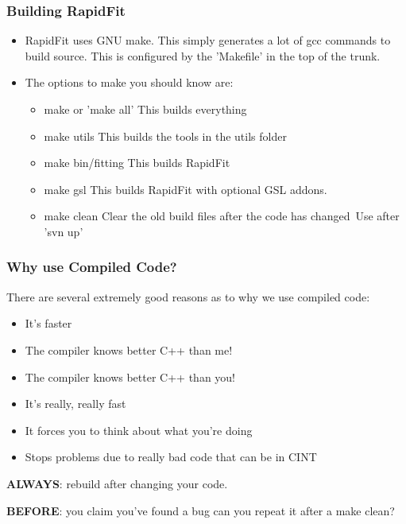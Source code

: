 \documentclass{beamer}
\begin{document}
\begin{frame}
\frametitle{Building RapidFit}
\begin{itemize}
 \item RapidFit uses GNU make.\newline
 This simply generates a lot of gcc commands to build source.\newline
 This is configured by the 'Makefile' in the top of the trunk.\newline
 \item The options to make you should know are:
 \small
 \begin{itemize}
  \item make or 'make all'\newline
  This builds everything
  \item make utils\newline
  This builds the tools in the utils folder
  \item make bin/fitting\newline
  This builds RapidFit
  \item make gsl\newline
  This builds RapidFit with optional GSL addons.
  \item make clean\newline
  Clear the old build files after the code has changed\newline~Use after 'svn up'
 \end{itemize}
\end{itemize}
\end{frame}

\begin{frame}
\frametitle{Why use Compiled Code?}

There are several extremely good reasons as to why we use compiled code:

\begin{itemize}
 \item It's faster
 \item The compiler knows better C++ than me!
 \item The compiler knows better C++ than you!
 \item It's really, really fast
 \item It forces you to think about what you're doing
 \item Stops problems due to really bad code that can be in CINT
\end{itemize}

\textbf{ALWAYS}: rebuild after changing your code.\newline

\textbf{BEFORE}: you claim you've found a bug can you repeat it after a make clean?


\end{frame}
\end{document}
